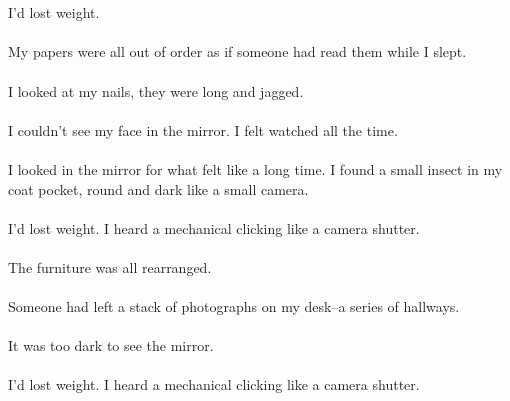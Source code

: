 \documentclass{article}
\begin{document}
    \section{}
    I'd lost weight. \\\\My papers were all out of order as if someone had read them while I slept. \\\\I looked at my nails, they were long and jagged. \\\\I couldn't see my face in the mirror. I felt watched all the time. \\\\I looked in the mirror for what felt like a long time. I found a small insect in my coat pocket, round and dark like a small camera. \\\\I'd lost weight. I heard a mechanical clicking like a camera shutter. \\\\The furniture was all rearranged. \\\\Someone had left a stack of photographs on my desk--a series of hallways. \\\\It was too dark to see the mirror. \\\\I'd lost weight. I heard a mechanical clicking like a camera shutter. \\\\
    \newpage
    
\end{document}
